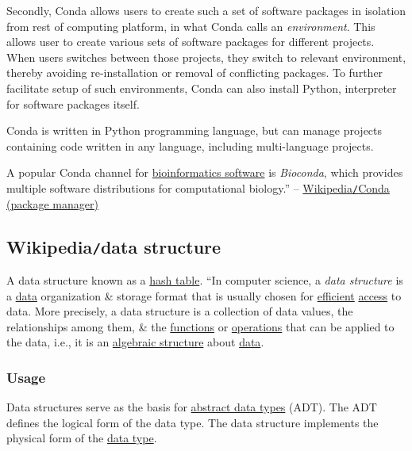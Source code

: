 \documentclass{article}
\begin{document}
Secondly, Conda allows users to create such a set of software packages in isolation from rest of computing platform, in what Conda calls an {\it environment}. This allows user to create various sets of software packages for different projects. When users switches between those projects, they switch to relevant environment, thereby avoiding re-installation or removal of conflicting packages. To further facilitate setup of such environments, Conda can also install Python, interpreter for software packages itself.

Conda is written in Python programming language, but can manage projects containing code written in any language, including multi-language projects.

A popular Conda channel for \href{https://en.wikipedia.org/wiki/List_of_bioinformatics_software}{bioinformatics software} is {\it Bioconda}, which provides multiple software distributions for computational biology.'' -- \href{https://en.wikipedia.org/wiki/Conda_(package_manager)}{Wikipedia{\tt/}Conda (package manager)}


\subsection{Wikipedia{\tt/}data structure}
{\sf A data structure known as a \href{https://en.wikipedia.org/wiki/Hash_table}{hash table}.} ``In computer science, a {\it data structure} is a \href{https://en.wikipedia.org/wiki/Data}{data} organization \& storage format that is usually chosen for \href{https://en.wikipedia.org/wiki/Efficiency}{efficient} \href{https://en.wikipedia.org/wiki/Data_access}{access} to data. More precisely, a data structure is a collection of data values, the relationships among them, \& the \href{https://en.wikipedia.org/wiki/Function_(computer_programming)}{functions} or \href{https://en.wikipedia.org/wiki/Operator_(computer_programming)}{operations} that can be applied to the data, i.e., it is an \href{https://en.wikipedia.org/wiki/Algebraic_structure}{algebraic structure} about \href{https://en.wikipedia.org/wiki/Data}{data}.

\subsubsection{Usage}
Data structures serve as the basis for \href{https://en.wikipedia.org/wiki/Abstract_data_type}{abstract data types} (ADT). The ADT defines the logical form of the data type. The data structure implements the physical form of the \href{https://en.wikipedia.org/wiki/Data_type}{data type}.
\end{document}
